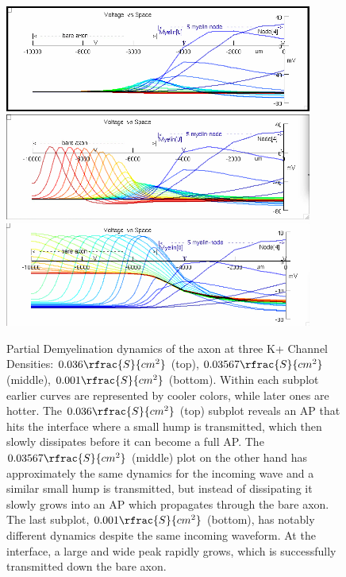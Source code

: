 \documentclass[12pt]{article}
\begin{document}
\begin{figure}[H]
\centering
\includegraphics[width=0.9\textwidth]{Results/Flattened/4a-036}
\includegraphics[width=0.9\textwidth]{Results/Flattened/4a-03567}
\includegraphics[width=0.9\textwidth]{Results/Flattened/4a-001}
\caption{\label{fig:P4a1-d} Partial Demyelination dynamics of the axon at three K+ Channel Densities: $0.036 \rfrac{S}{cm^{2}}$ (top), $0.03567 \rfrac{S}{cm^{2}}$ (middle), $0.001 \rfrac{S}{cm^{2}}$ (bottom). Within each subplot earlier curves are represented by cooler colors, while later ones are hotter. The $0.036 \rfrac{S}{cm^{2}}$ (top) subplot reveals an AP that hits the interface where a small hump is transmitted, which then slowly dissipates before it can become a full AP. The $0.03567 \rfrac{S}{cm^{2}}$ (middle) plot on the other hand has approximately the same dynamics for the incoming wave and a similar small hump is transmitted, but instead of dissipating it slowly grows into an AP which propagates through the bare axon. The last subplot, $0.001 \rfrac{S}{cm^{2}}$ (bottom), has notably different dynamics despite the same incoming waveform. At the interface, a large and wide peak rapidly grows, which is successfully transmitted down the bare axon.}
\end{figure}
\end{document}

